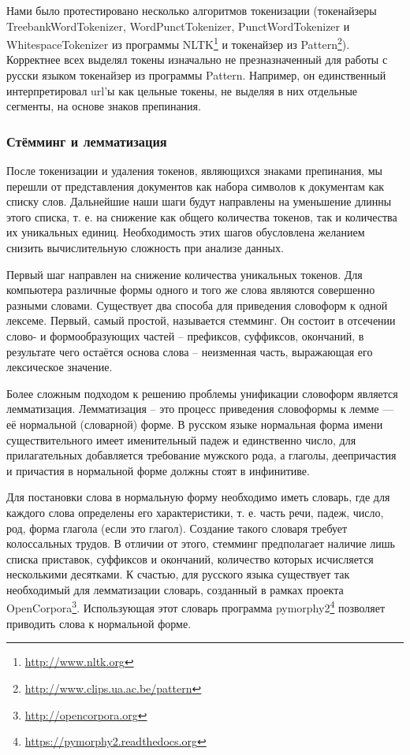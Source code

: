 Нами было протестировано несколько алгоритмов токенизации (токенайзеры TreebankWordTokenizer, WordPunctTokenizer, PunctWordTokenizer и WhitespaceTokenizer из программы NLTK\footnote{\href{http://www.nltk.org}{http://www.nltk.org}} и токенайзер из Pattern\footnote{\href{http://www.clips.ua.ac.be/pattern}{http://www.clips.ua.ac.be/pattern}}). Корректнее всех выделял токены изначально не презназначенный для работы с русски языком токенайзер из программы Pattern. Например, он единственный интерпретировал url'ы как цельные токены, не выделяя в них отдельные сегменты, на основе знаков препинания.

\subsubsection{Стёмминг и лемматизация}
После токенизации и удаления токенов, являющихся знаками препинания, мы перешли от представления документов как набора символов к документам как списку слов. Дальнейшие наши шаги будут направлены на уменьшение длинны этого списка, т. е. на снижение как общего количества токенов, так и количества их уникальных единиц. Необходимость этих шагов обусловлена желанием снизить вычислительную сложность при анализе данных.

Первый шаг направлен на снижение количества уникальных токенов. Для компьютера различные формы одного и того же слова являются совершенно разными словами. Существует два способа для приведения словоформ к одной лексеме. Первый, самый простой, называется стемминг. Он состоит в отсечении слово- и формообразующих частей -- префиксов, суффиксов, окончаний, в результате чего остаётся основа слова -- неизменная часть, выражающая его лексическое значение.

Более сложным подходом к решению проблемы унификации словоформ является лемматизация. Лемматизация -- это процесс приведения словоформы к лемме — её нормальной (словарной) форме. В русском языке нормальная форма имени существительного имеет именительный падеж и единственно число, для прилагательных добавляется требование мужского рода, а глаголы, деепричастия и причастия в нормальной форме должны стоят в инфинитиве.

Для постановки слова в нормальную форму необходимо иметь словарь, где для каждого слова определены его характеристики, т. е. часть речи, падеж, число, род, форма глагола (если это глагол). Создание такого словаря требует колоссальных трудов. В отличии от этого, стемминг предполагает наличие лишь списка приставок, суффиксов и окончаний, количество которых исчисляется несколькими десятками. К счастью, для русского языка существует так необходимый для лемматизации словарь, созданный в рамках проекта OpenCorpora\footnote{\href{http://opencorpora.org}{http://opencorpora.org}}. Использующая этот словарь программа pymorphy2\footnote{\href{https://pymorphy2.readthedocs.org}{https://pymorphy2.readthedocs.org}} позволяет приводить слова к нормальной форме.

